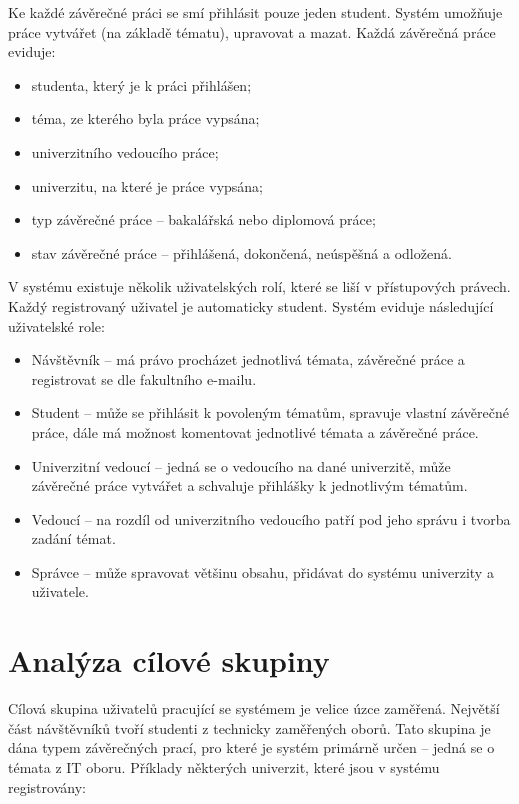 Ke každé závěrečné práci se smí přihlásit pouze jeden student. Systém umožňuje práce vytvářet (na základě tématu), upravovat a mazat. Každá závěrečná práce eviduje:

\begin{itemize}
    \item studenta, který je k práci přihlášen;
    \item téma, ze kterého byla práce vypsána;
    \item univerzitního vedoucího práce;
    \item univerzitu, na které je práce vypsána;
    \item typ závěrečné práce -- bakalářská nebo diplomová práce;
    \item stav závěrečné práce -- přihlášená, dokončená, neúspěšná a odložená.
\end{itemize}

V systému existuje několik uživatelských rolí, které se liší v přístupových právech. Každý registrovaný uživatel je automaticky student. Systém eviduje následující uživatelské role:

\begin{itemize}
    \item Návštěvník -- má právo procházet jednotlivá témata, závěrečné práce a registrovat se dle fakultního e-mailu.
    \item Student -- může se přihlásit k povoleným tématům, spravuje vlastní závěrečné práce, dále má možnost komentovat jednotlivé témata a závěrečné práce.
    \item Univerzitní vedoucí -- jedná se o vedoucího na dané univerzitě, může závěrečné práce vytvářet a schvaluje přihlášky k jednotlivým tématům.
    \item Vedoucí -- na rozdíl od univerzitního vedoucího patří pod jeho správu i tvorba zadání témat.
    \item Správce -- může spravovat většinu obsahu, přidávat do systému univerzity a uživatele.
\end{itemize}

\section{Analýza cílové skupiny}

Cílová skupina uživatelů pracující se systémem je velice úzce zaměřená. Největší část návštěvníků tvoří studenti z technicky zaměřených oborů. Tato skupina je dána typem závěrečných prací, pro které je systém primárně určen -- jedná se o témata z IT oboru. Příklady některých univerzit, které jsou v systému registrovány:

